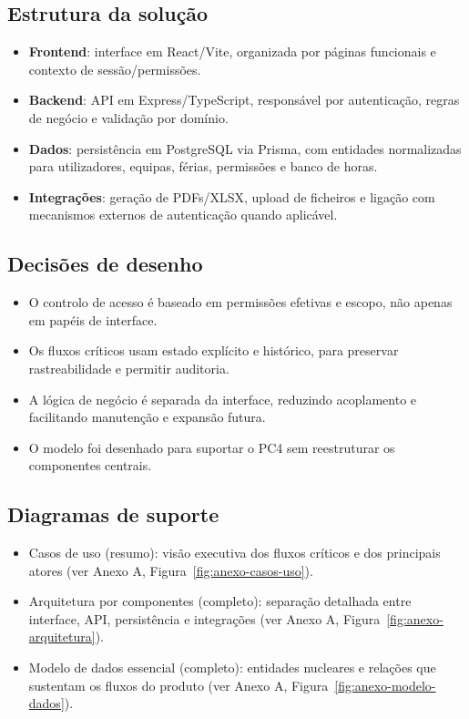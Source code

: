 \documentclass[11pt,a4paper,twoside]{article}
\begin{document}
\subsection{Estrutura da solução}
\begin{itemize}
  \item \textbf{Frontend}: interface em React/Vite, organizada por páginas funcionais e contexto de sessão/permissões.
  \item \textbf{Backend}: API em Express/TypeScript, responsável por autenticação, regras de negócio e validação por domínio.
  \item \textbf{Dados}: persistência em PostgreSQL via Prisma, com entidades normalizadas para utilizadores, equipas, férias, permissões e banco de horas.
  \item \textbf{Integrações}: geração de PDFs/XLSX, upload de ficheiros e ligação com mecanismos externos de autenticação quando aplicável.
\end{itemize}

\subsection{Decisões de desenho}
\begin{itemize}
  \item O controlo de acesso é baseado em permissões efetivas e escopo, não apenas em papéis de interface.
  \item Os fluxos críticos usam estado explícito e histórico, para preservar rastreabilidade e permitir auditoria.
  \item A lógica de negócio é separada da interface, reduzindo acoplamento e facilitando manutenção e expansão futura.
  \item O modelo foi desenhado para suportar o PC4 sem reestruturar os componentes centrais.
\end{itemize}

\subsection{Diagramas de suporte}
\begin{itemize}
  \item Casos de uso (resumo): visão executiva dos fluxos críticos e dos principais atores (ver Anexo A, Figura~\ref{fig:anexo-casos-uso}).
  \item Arquitetura por componentes (completo): separação detalhada entre interface, API, persistência e integrações (ver Anexo A, Figura~\ref{fig:anexo-arquitetura}).
  \item Modelo de dados essencial (completo): entidades nucleares e relações que sustentam os fluxos do produto (ver Anexo A, Figura~\ref{fig:anexo-modelo-dados}).
\end{itemize}
\end{document}
